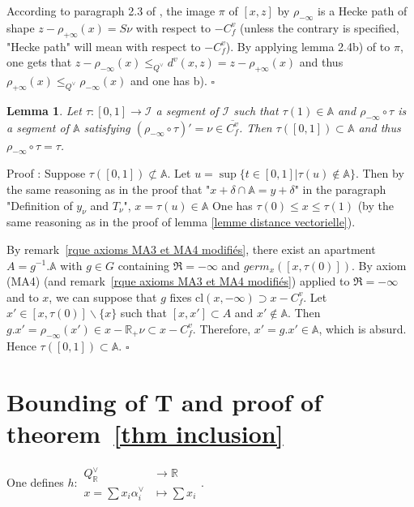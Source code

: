 \documentclass[12pt]{article}
\theoremstyle{plain}
\newtheorem{lemme}[thm]{Lemma}
\theoremstyle{definition}
\newcommand{\R}{\mathbb{R}}
\newcommand{\A}{\mathbb{A}}
\begin{document}
According to paragraph 2.3 of \cite{gaussent2014spherical}, the image $\pi$ of $[x,z]$ by $\rho_{-\infty}$ is a Hecke path of shape $z-\rho_{+\infty}(x)=S\nu$ with respect to $-C^v_f$ (unless the contrary is specified, "Hecke path" will mean with respect to $-C^v_f$). By applying lemma 2.4b) of \cite{gaussent2014spherical} to $\pi$, one gets that $z-\rho_{-\infty}(x)\leq _{Q^\vee} d^v(x,z)=z-\rho_{+\infty}(x)$ and thus $\rho_{+\infty}(x)\leq_{Q^\vee} \rho_{-\infty}(x)$ and one has b). $\square$


\begin{lemme}\label{lemme image réciproque de segments}
Let $\tau:[0,1]\rightarrow \mathcal{I}$ a segment of $\mathcal{I}$ such that $\tau(1)\in \mathbb{A}$ and $\rho_{-\infty}\circ\tau$ is a segment of $\mathbb{A}$ satisfying  $(\rho_{-\infty}\circ\tau)'=\nu\in \overline{C^v_f}$. Then $\tau([0,1])\subset \mathbb{A}$ and thus $\rho_{-\infty}\circ \tau=\tau$.
\end{lemme}

Proof : Suppose $\tau([0,1])\not\subset \A$. Let $u=\sup\{t\in [0,1]|\tau(u)\notin \A\}$. Then by the same reasoning as in the proof that "$x+\delta\cap\A=y+\delta$" in the paragraph "Definition of $y_\nu$ and $T_\nu$", $x=\tau(u)\in\A$ One has $\tau(0)\leq x\leq \tau(1)$ (by the same reasoning as in the proof of lemma \ref{lemme distance vectorielle}). 

By remark~\ref{rque axioms MA3 et MA4 modifiés}, there exist an apartment $A=g^{-1}.\A$ with $g\in G$ containing $\mathfrak{R}=-\infty$ and $germ_x([x,\tau(0)])$. By axiom (MA4) (and remark~\ref{rque axioms MA3 et MA4 modifiés}) applied to $\mathfrak{R}=-\infty$ and to $x$, we can suppose that $g$ fixes $\mathrm{cl}(x,-\infty)\supset x-C_f^v$.  
Let $x'\in [x,\tau(0)]\backslash\{x\}$ such that $[x,x']\subset A$ and $x'\notin \A$. Then $g.x'=\rho_{-\infty}(x')\in x-\R_+\nu\subset x-C_f^v$. Therefore, $x'=g.x'\in \A$, which is absurd. Hence $\tau([0,1])\subset \A$. $\square$





\section{Bounding of T and proof of theorem~\ref{thm inclusion} }\label{sect bounding of T}


One defines $h:\begin{aligned} Q^\vee_{\mathbb{R}}& \rightarrow \mathbb{R}\\
x=\sum x_i\alpha_i^\vee & \mapsto \sum x_i\end{aligned}.$
\end{document}
